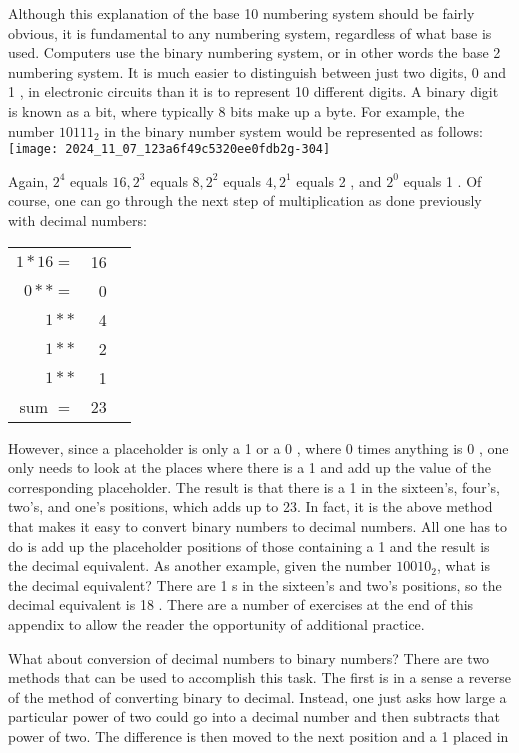 \documentclass[10pt]{article}
\begin{document}
Although this explanation of the base 10 numbering system should be fairly obvious, it is fundamental to any numbering system, regardless of what base is used. Computers use the binary numbering system, or in other words the base 2 numbering system. It is much easier to distinguish between just two digits, 0 and 1 , in electronic circuits than it is to represent 10 different digits. A binary digit is known as a bit, where typically 8 bits make up a byte. For example, the number $10111_{2}$ in the binary number system would be represented as follows:\\
\texttt{[image: 2024\_11\_07\_123a6f49c5320ee0fdb2g-304]}

Again, $2^{4}$ equals $16,2^{3}$ equals $8,2^{2}$ equals $4,2^{1}$ equals 2 , and $2^{0}$ equals 1 . Of course, one can go through the next step of multiplication as done previously with decimal numbers:

\begin{center}
\begin{tabular}{rrr}
$1 * 16=$ & 16 \\
$0 * *=$ & 0 \\
$1 * *$ & 4 \\
$1 * *$ & 2 \\
$1 * *$ & 1 \\
\hline
sum $=$ & 23 \\
\hline
\end{tabular}
\end{center}

However, since a placeholder is only a 1 or a 0 , where 0 times anything is 0 , one only needs to look at the places where there is a 1 and add up the value of the corresponding placeholder. The result is that there is a 1 in the sixteen's, four's, two's, and one's positions, which adds up to 23. In fact, it is the above method that makes it easy to convert binary numbers to decimal numbers. All one has to do is add up the placeholder positions of those containing a 1 and the result is the decimal equivalent. As another example, given the number $10010_{2}$, what is the decimal equivalent? There are 1 s in the sixteen's and two's positions, so the decimal equivalent is 18 . There are a number of exercises at the end of this appendix to allow the reader the opportunity of additional practice.

What about conversion of decimal numbers to binary numbers? There are two methods that can be used to accomplish this task. The first is in a sense a reverse of the method of converting binary to decimal. Instead, one just asks how large a particular power of two could go into a decimal number and then subtracts that power of two. The difference is then moved to the next position and a 1 placed in
\end{document}
